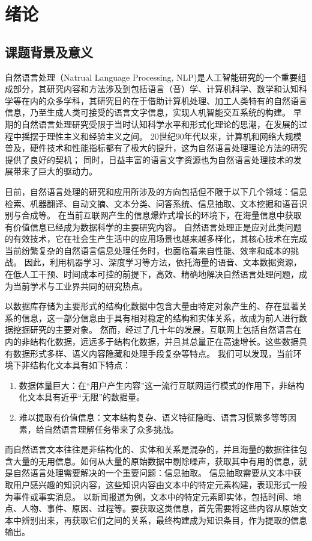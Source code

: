 \chapter{绪论}
\label{chap:introduction}
\section{课题背景及意义}
自然语言处理（Natrual Language Processing, NLP)是人工智能研究的一个重要组成部分，其研究内容和方法涉及到包括语言（音）学、计算机科学、数学和认知科学等在内的众多学科，其研究目的在于借助计算机处理、加工人类特有的自然语言信息，乃至生成人类可接受的语言文字信息，实现人机智能交互系统的构建。
早期的自然语言处理研究受限于当时认知科学水平和形式化理论的思潮，在发展的过程中摇摆于理性主义和经验主义之间。
20世纪90年代以来，计算机和网络大规模普及，硬件技术和性能指标都有了极大的提升，这为自然语言处理理论方法的研究提供了良好的契机；
同时，日益丰富的语言文字资源也为自然语言处理技术的发展带来了巨大的驱动力。

目前，自然语言处理的研究和应用所涉及的方向包括但不限于以下几个领域：信息检索、机器翻译、自动文摘、文本分类、问答系统、信息抽取、文本挖掘和语音识别与合成等。
在当前互联网产生的信息爆炸式增长的环境下，在海量信息中获取有价值信息已经成为数据科学的主要研究内容。
自然语言处理正是应对此类问题的有效技术，它在社会生产生活中的应用场景也越来越多样化，其核心技术在完成当前纷繁复杂的自然语言信息处理任务时，也面临着来自性能、效率和成本的挑战。
因此，利用机器学习、深度学习等方法，依托海量的语音、文本数据资源，在低人工干预、时间成本可控的前提下，高效、精确地解决自然语言处理问题，成为当前学术与工业界共同的研究热点。

以数据库存储为主要形式的结构化数据中包含大量由特定对象产生的、存在显著关系的信息，这一部分信息由于具有相对稳定的结构和实体关系，故成为前人进行数据挖掘研究的主要对象。
然而，经过了几十年的发展，互联网上包括自然语言在内的非结构化数据，远远多于结构化数据，并且其总量正在高速增长。这些数据具有数据形式多样、语义内容隐藏和处理手段复杂等特点。
我们可以发现，当前环境下非结构化文本具有如下特点：
\begin{enumerate}[（1）]
    \item 数据体量巨大：在“用户产生内容”这一流行互联网运行模式的作用下，非结构化文本具有近乎“无限”的数据量。
    \item 难以提取有价值信息：文本结构复杂、语义特征隐晦、语言习惯繁多等等因素，给自然语言理解任务带来了众多挑战。
\end{enumerate}
而自然语言文本往往是非结构化的、实体和关系是混杂的，并且海量的数据往往包含大量的无用信息。如何从大量的原始数据中剔除噪声，获取其中有用的信息，就是自然语言处理需要解决的一个重要问题：信息抽取。
信息抽取需要从文本中获取用户感兴趣的知识内容，这些知识内容由文本中的特定元素构建，表现形式一般为事件或事实消息。
以新闻报道为例，文本中的特定元素即实体，包括时间、地点、人物、事件、原因、过程等。要获取这类信息，首先需要将这些内容从原始文本中辨别出来，再获取它们之间的关系，最终构建成为知识条目，作为提取的信息输出。

